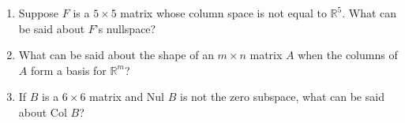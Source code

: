 \documentclass[12pt]{article}
\begin{document}
\begin{multicols*}{2}
\begin{enumerate}
		\vfill

		\item Suppose $F$ is a $5\times 5$ matrix whose column space is not equal to $\mathbb{R}^5$. What can be said about $F$'s nullspace?

		\vfill

		\item What can be said about the shape of an $m\times n$ matrix $A$ when the columns of $A$ form a basis for $\mathbb{R}^m$?

		\vfill

		\item If $B$ is a $6\times 6$ matrix and Nul $B$ is not the zero subspace, what can be said about Col $B$?

		\vfill
	\end{enumerate}
\end{multicols*}
\end{document}
